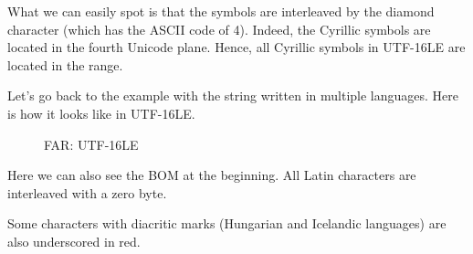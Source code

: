 What we can easily spot is that the symbols are interleaved by the diamond character (which has the ASCII code of 4).
Indeed, the Cyrillic symbols are located in the fourth Unicode plane.
Hence, all Cyrillic symbols in UTF-16LE are located in the  range.

Let's go back to the example with the string written in multiple languages.
Here is how it looks like in UTF-16LE.

\begin{figure}[H]
\centering
{}
\caption{FAR: UTF-16LE}
\end{figure}

Here we can also see the \ac{BOM} at the beginning.
All Latin characters are interleaved with a zero byte.

Some characters with diacritic marks (Hungarian and Icelandic languages) are also underscored in red.



